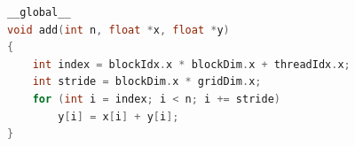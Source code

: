 \begin{lstlisting}[language=C++,
caption=Beispielhafter CUDA-Kernel zum Iterieren über zwei Datensätze \cite{Harris2017},
label=cuda_example]
__global__
void add(int n, float *x, float *y)
{
	int index = blockIdx.x * blockDim.x + threadIdx.x;
	int stride = blockDim.x * gridDim.x;
	for (int i = index; i < n; i += stride)
		y[i] = x[i] + y[i];
}
\end{lstlisting}